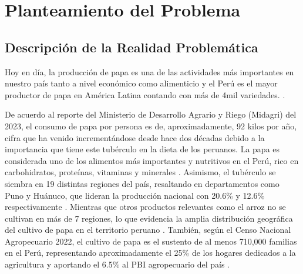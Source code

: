 \chapter{Planteamiento del Problema}
\section{Descripción de la Realidad Problemática}

Hoy en día, la producción de papa es una de las actividades más importantes en nuestro país tanto a nivel económico como alimenticio y el Perú es el mayor productor de papa en América Latina contando con más de 4mil variedades.\parencite{cr_elcomercioproduccionpapa} .  


De acuerdo al reporte del Ministerio de Desarrollo Agrario y Riego (Midagri) del 2023, el consumo de papa por persona es de, aproximadamente, 92 kilos por año, cifra que ha venido incrementándose desde hace dos décadas debido a la importancia que tiene este tubérculo en la dieta de los peruanos. La papa es considerada uno de los alimentos más importantes y nutritivos en el Perú, rico en carbohidratos, proteínas, vitaminas y minerales \parencite{fao_importancia_papa}. Asimismo, el tubérculo se siembra en 19 distintas regiones del país, resaltando en departamentos como Puno y Huánuco, que lideran la producción nacional con 20.6\% y 12.6\% respectivamente \parencite{minagri_estadisticas_2022}. Mientras que otros productos relevantes como el arroz no se cultivan en más de 7 regiones, lo que evidencia la amplia distribución geográfica del cultivo de papa en el territorio peruano \parencite{cr_agroinforma1}. También, según el Censo Nacional Agropecuario 2022, el cultivo de papa es el sustento de al menos 710,000 familias en el Perú, representando aproximadamente el 25\% de los hogares dedicados a la agricultura y aportando el 6.5\% al PBI agropecuario del país \parencite{inei_cenagro_2022}.
 
